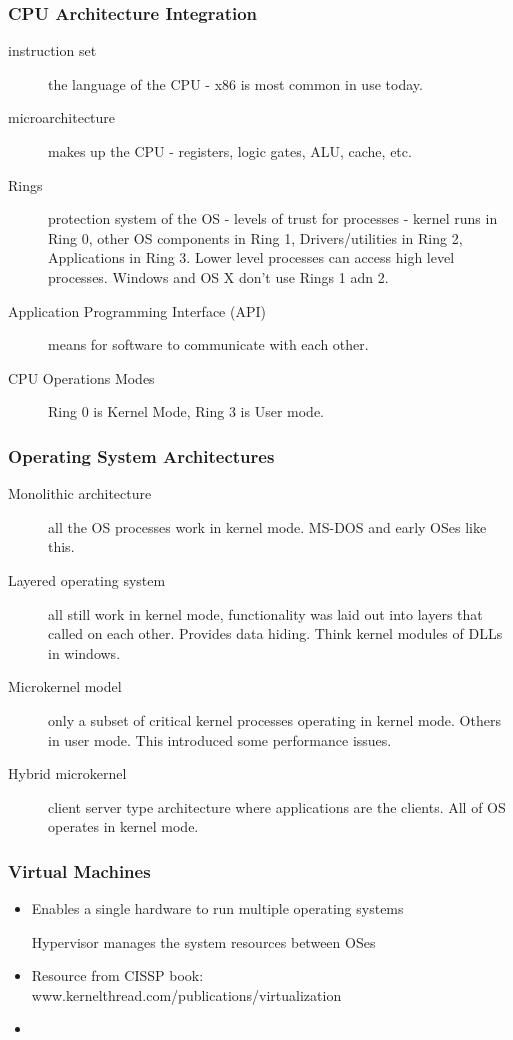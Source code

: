 \documentclass[11pt]{article}
\begin{document}
\subsubsection{CPU Architecture Integration}
\label{sec:orgf963580}
\begin{description}
\item[{instruction set}] the language of the CPU - x86 is most common in use today.
\item[{microarchitecture}] makes up the CPU - registers, logic gates, ALU, cache, etc.
\item[{Rings}] protection system of the OS - levels of trust for processes - kernel runs in Ring 0, other OS components in Ring 1, Drivers/utilities in Ring 2, Applications in Ring 3. Lower level processes can access high level processes. Windows and OS X don't use Rings 1 adn 2.
\item[{Application Programming Interface (API)}] means for software to communicate with each other.
\item[{CPU Operations Modes}] Ring 0 is Kernel Mode, Ring 3 is User mode.
\end{description}
\subsubsection{Operating System Architectures}
\label{sec:orgdba5e8c}
\begin{description}
\item[{Monolithic architecture}] all the OS processes work in kernel mode. MS-DOS and early OSes like this.
\item[{Layered operating system}] all still work in kernel mode, functionality was laid out into layers that called on each other. Provides data hiding. Think kernel modules of DLLs in windows.
\item[{Microkernel model}] only a subset of critical kernel processes operating in kernel mode. Others in user mode. This introduced some performance issues.
\item[{Hybrid microkernel}] client server type architecture where applications are the clients. All of OS operates in kernel mode.
\end{description}
\subsubsection{Virtual Machines}
\label{sec:orga65aaad}
\begin{itemize}
\item Enables a single hardware to run multiple operating systems
\item[{Hypervisor}] manages the system resources between OSes
\item Resource from CISSP book: www.kernelthread.com/publications/virtualization
\item 
\end{itemize}
\end{document}

